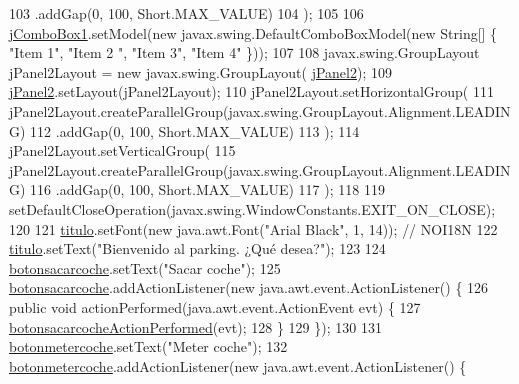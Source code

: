 \begin{DoxyCode}
103             .addGap(0, 100, Short.MAX\_VALUE)
104         );
105 
106         \mbox{\hyperlink{classejercicio2_1_1_interfaz_a132c36c6003bac5a001076557090fa40}{jComboBox1}}.setModel(\textcolor{keyword}{new} javax.swing.DefaultComboBoxModel(\textcolor{keyword}{new} String[] \{ \textcolor{stringliteral}{"Item 1"}, \textcolor{stringliteral}{"Item 2
      "}, \textcolor{stringliteral}{"Item 3"}, \textcolor{stringliteral}{"Item 4"} \}));
107 
108         javax.swing.GroupLayout jPanel2Layout = \textcolor{keyword}{new} javax.swing.GroupLayout(
      \mbox{\hyperlink{classejercicio2_1_1_interfaz_a6ef595f7c876b199b34095e19c5b206a}{jPanel2}});
109         \mbox{\hyperlink{classejercicio2_1_1_interfaz_a6ef595f7c876b199b34095e19c5b206a}{jPanel2}}.setLayout(jPanel2Layout);
110         jPanel2Layout.setHorizontalGroup(
111             jPanel2Layout.createParallelGroup(javax.swing.GroupLayout.Alignment.LEADING)
112             .addGap(0, 100, Short.MAX\_VALUE)
113         );
114         jPanel2Layout.setVerticalGroup(
115             jPanel2Layout.createParallelGroup(javax.swing.GroupLayout.Alignment.LEADING)
116             .addGap(0, 100, Short.MAX\_VALUE)
117         );
118 
119         setDefaultCloseOperation(javax.swing.WindowConstants.EXIT\_ON\_CLOSE);
120 
121         \mbox{\hyperlink{classejercicio2_1_1_interfaz_af6343959b01523a71cdf2296b61672e0}{titulo}}.setFont(\textcolor{keyword}{new} java.awt.Font(\textcolor{stringliteral}{"Arial Black"}, 1, 14)); \textcolor{comment}{// NOI18N}
122         \mbox{\hyperlink{classejercicio2_1_1_interfaz_af6343959b01523a71cdf2296b61672e0}{titulo}}.setText(\textcolor{stringliteral}{"Bienvenido al parking. ¿Qué desea?"});
123 
124         \mbox{\hyperlink{classejercicio2_1_1_interfaz_a643d25060e73ac4c53a95d7b4bfdae52}{botonsacarcoche}}.setText(\textcolor{stringliteral}{"Sacar coche"});
125         \mbox{\hyperlink{classejercicio2_1_1_interfaz_a643d25060e73ac4c53a95d7b4bfdae52}{botonsacarcoche}}.addActionListener(\textcolor{keyword}{new} java.awt.event.ActionListener() \{
126             \textcolor{keyword}{public} \textcolor{keywordtype}{void} actionPerformed(java.awt.event.ActionEvent evt) \{
127                 \mbox{\hyperlink{classejercicio2_1_1_interfaz_ade1ca9ed4198f4774821ffa554a3be9c}{botonsacarcocheActionPerformed}}(evt);
128             \}
129         \});
130 
131         \mbox{\hyperlink{classejercicio2_1_1_interfaz_a312037c2c5b2cd0f23fd65998314ee09}{botonmetercoche}}.setText(\textcolor{stringliteral}{"Meter coche"});
132         \mbox{\hyperlink{classejercicio2_1_1_interfaz_a312037c2c5b2cd0f23fd65998314ee09}{botonmetercoche}}.addActionListener(\textcolor{keyword}{new} java.awt.event.ActionListener() \{

\end{DoxyCode}

